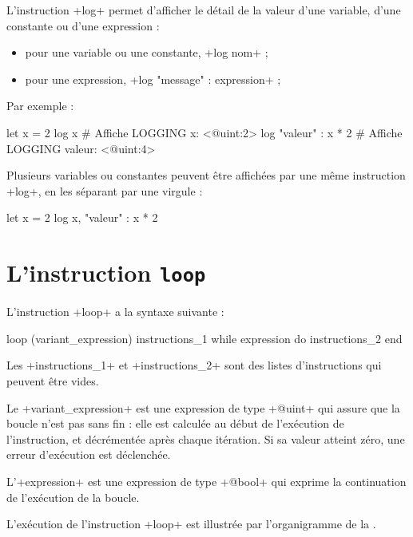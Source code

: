 
L'instruction \ggs+log+ permet d'afficher le détail de la valeur d'une variable, d'une constante ou d'une expression :
\begin{itemize}
  \item pour une variable ou une constante, \ggs+log nom+ ;
  \item pour une expression, \ggs+log "message" : expression+ ;
\end{itemize}

Par exemple :
\begin{galgas}
let x = 2
log x # Affiche LOGGING x: <@uint:2>
log "valeur" : x * 2 # Affiche LOGGING valeur: <@uint:4>
\end{galgas}

Plusieurs variables ou constantes peuvent être affichées par une même instruction \ggs+log+, en les séparant par une virgule :
\begin{galgas}
let x = 2
log x, "valeur" : x * 2
\end{galgas}














\section{L'instruction \texttt{loop}}


L'instruction \ggs+loop+ a la syntaxe suivante :
\begin{galgas}
loop (variant_expression)
  instructions_1
while expression do
  instructions_2
end
\end{galgas}


Les \ggs+instructions_1+ et \ggs+instructions_2+ sont des listes d'instructions qui peuvent être vides.


Le \ggs+variant_expression+ est une expression de type \ggs+@uint+ qui assure que la boucle n'est pas sans fin : elle est calculée au début de l'exécution de l'instruction, et décrémentée après chaque itération. Si sa valeur atteint zéro, une erreur d'exécution est déclenchée.

L'\ggs+expression+ est une expression de type \ggs+@bool+ qui exprime la continuation de l'exécution de la boucle.

L'exécution de l'instruction \ggs+loop+ est illustrée par l'organigramme de la .


